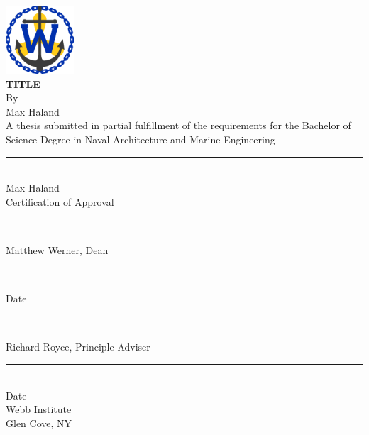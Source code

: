 \begin{titlepage}
	\begin{center}
\begin{singlespacing}
	\includegraphics[width=1.0in]{webblogo}
	\\[1\baselineskip]
	\textbf{TITLE}
	\\[1\baselineskip]
	By
	\\[1\baselineskip]
	Max Haland
	\\[1\baselineskip]
	A thesis submitted in partial fulfillment of the requirements for the Bachelor of Science Degree in Naval Architecture and Marine Engineering
	\\[2\baselineskip]
	\rule{3.5in}{1pt}\\
	Max Haland
	\\[3\baselineskip]
	Certification of Approval
	\\[2\baselineskip]
	\rule{3.5in}{1pt}\\
	Matthew Werner, Dean
	\\[2\baselineskip]
	\rule{1.25in}{1pt}\\
	Date
	\\[2\baselineskip]
	\rule{3.5in}{1pt}\\
	Richard Royce, Principle Adviser
	\\[2\baselineskip]
	\rule{1.25in}{1pt}\\
	Date
	\\[2\baselineskip]
	Webb Institute
	\\
	Glen Cove, NY
\end{singlespacing}
\end{center}
\end{titlepage}